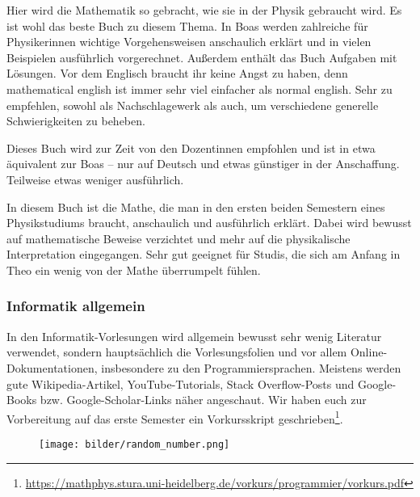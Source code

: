 \begin{description}[style=unboxed]
\item[Boas: Mathematical Methods in the Physical Science]{
		Hier wird die Mathematik so gebracht, wie sie in der Physik gebraucht wird. Es ist wohl das beste Buch zu diesem Thema. In Boas werden zahlreiche für Physikerinnen wichtige Vorgehensweisen anschaulich erklärt und in vielen Beispielen ausführlich vorgerechnet. Außerdem enthält das Buch Aufgaben mit Lösungen. Vor dem Englisch braucht ihr keine Angst zu haben, denn mathematical english ist immer sehr viel einfacher als normal english. Sehr zu empfehlen, sowohl als Nachschlagewerk als auch, um verschiedene generelle Schwierigkeiten zu beheben.}

\item[Lang, Pucker: Mathematische Methoden in der Physik]{
		Dieses Buch wird zur Zeit von den Dozentinnen empfohlen und ist in etwa äquivalent zur Boas -- nur auf Deutsch und etwas günstiger in der Anschaffung. Teilweise etwas weniger ausführlich.}

\item[Otto: Rechenmethoden für Studierende d. Physik im ersten Jahr]{
		In diesem Buch ist die Mathe, die man in den ersten beiden Semestern eines Physikstudiums braucht, anschaulich und ausführlich erklärt. Dabei wird bewusst auf mathematische Beweise verzichtet und mehr auf die physikalische Interpretation eingegangen. Sehr gut geeignet für Studis, die sich am Anfang in Theo ein wenig von der Mathe überrumpelt fühlen.}
\end{description}

\subsubsection{Informatik allgemein}
In den Informatik-Vorlesungen wird allgemein bewusst sehr wenig Literatur verwendet, sondern hauptsächlich die Vorlesungsfolien und vor allem Online-Dokumentationen, insbesondere zu den Programmiersprachen. Meistens werden gute Wikipedia-Artikel, YouTube-Tutorials, Stack Overflow-Posts und Google-Books bzw. Google-Scholar-Links näher angeschaut. Wir haben euch zur Vorbereitung auf das erste Semester ein Vorkursskript geschrieben\footnote{\url{https://mathphys.stura.uni-heidelberg.de/vorkurs/programmier/vorkurs.pdf}}.

\begin{figure}[b]
\centering
\texttt{[image: bilder/random\_number.png]}

\end{figure}

